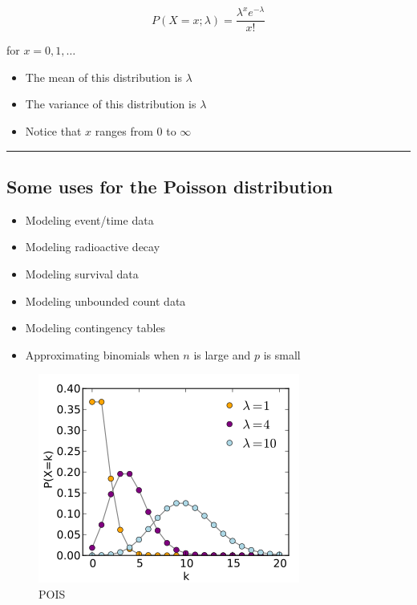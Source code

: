 \documentclass[]{article}
\begin{document}
\[P(X = x; \lambda) = \frac{\lambda^x e^{-\lambda}}{x!}\]

for \(x=0,1,\ldots\)

\begin{itemize}
\item
  The mean of this distribution is \(\lambda\)
\item
  The variance of this distribution is \(\lambda\)
\item
  Notice that \(x\) ranges from \(0\) to \(\infty\)
\end{itemize}

\begin{center}\rule{0.5\linewidth}{\linethickness}\end{center}

\hypertarget{some-uses-for-the-poisson-distribution}{%
\subsection{Some uses for the Poisson
distribution}\label{some-uses-for-the-poisson-distribution}}

\begin{itemize}
\item
  Modeling event/time data
\item
  Modeling radioactive decay
\item
  Modeling survival data
\item
  Modeling unbounded count data
\item
  Modeling contingency tables
\item
  Approximating binomials when \(n\) is large and \(p\) is small
\end{itemize}

\begin{figure}
\centering
\includegraphics{pois.png}
\caption{POIS}
\end{figure}
\end{document}
